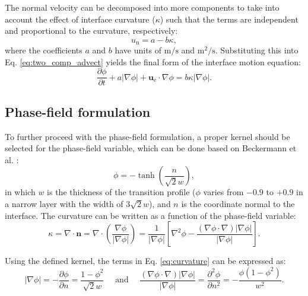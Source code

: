 The normal velocity can be decomposed into more components to take into account the effect of interface curvature ($\kappa$) such that the terms are independent and proportional to the curvature, respectively:
\begin{equation}
u_{\mathrm{n}} = a - b \kappa,
\end{equation}
where the coefficients $a$ and $b$ have units of $\mathrm{m}/\mathrm{s}$ and $\mathrm{m}^2/\mathrm{s}$. Substituting this into Eq. \ref{eq:two_comp_advect}  yields the final form of the interface motion equation:
\begin{equation} \label{eq:advect_kappa}
\frac{\partial \phi}{\partial t}+a|\nabla \phi|+\boldsymbol{u}_{\mathrm{e}} \cdot \nabla \phi=b \kappa|\nabla \phi|.
\end{equation}


\subsection{Phase-field formulation}

To further proceed with the phase-field formulation, a proper kernel should be selected for the phase-field variable, which can be done based on Beckermann et al. \cite{Beckermann1999}:
\begin{equation} \label{eq:kernel}
\phi=-\tanh \left(\frac{n}{\sqrt{2} w}\right),
\end{equation}
in which $w$ is the thickness of the transition profile ($\phi$ varies from $-0.9$ to $+0.9$ in a narrow layer with the width of $3 \sqrt{2} w$), and $n$ is the coordinate normal to the interface. The curvature can be written as a function of the phase-field variable:
\begin{equation}  \label{eq:curvature}
\kappa=\nabla \cdot \boldsymbol{n}=\nabla \cdot\left(\frac{\nabla \phi}{|\nabla \phi|}\right)=\frac{1}{|\nabla \phi|}\left[\nabla^{2} \phi-\frac{(\nabla \phi \cdot \nabla)|\nabla \phi|}{|\nabla \phi|}\right].
\end{equation}

Using the defined kernel, the terms in Eq. \ref{eq:curvature} can be expressed as:
\begin{equation} \label{eq:normal_terms}
|\nabla \phi|=-\frac{\partial \phi}{\partial n}=\frac{1-\phi^{2}}{\sqrt{2} w} \quad \text { and } \quad \frac{(\nabla \phi \cdot \nabla)|\nabla \phi|}{|\nabla \phi|}=\frac{\partial^{2} \phi}{\partial n^{2}}=-\frac{\phi\left(1-\phi^{2}\right)}{w^{2}}.
\end{equation}

